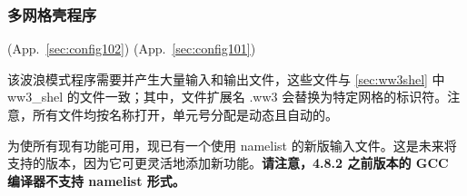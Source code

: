 \vsssub
\subsubsection{多网格壳程序} \label{sec:ww3multi}
\vsssub

 (App.~\ref{sec:config102})
 (App.~\ref{sec:config101})

\vspace{\baselineskip}
\noindent
该波浪模式程序需要并产生大量输入和输出文件，这些文件与 \para\ref{sec:ww3shel} 中 {\file ww3\_shel} 的文件一致；其中，文件扩展名 {\file .ww3} 会替换为特定网格的标识符。注意，所有文件均按名称打开，单元号分配是动态且自动的。

为使所有现有功能可用，现已有一个使用 namelist 的新版输入文件。这是未来将支持的版本，因为它可更灵活地添加新功能。{\bf 请注意，4.8.2 之前版本的 GCC 编译器不支持 namelist 形式。}

\pb
